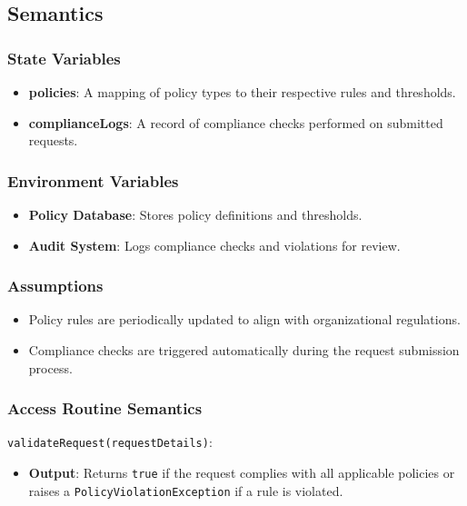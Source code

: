 \documentclass[12pt, titlepage]{article}
\begin{document}
\subsection{Semantics}

\subsubsection{State Variables}
\begin{itemize}
    \item \textbf{policies}: A mapping of policy types to their respective rules and thresholds.
    \item \textbf{complianceLogs}: A record of compliance checks performed on submitted requests.
\end{itemize}

\subsubsection{Environment Variables}
\begin{itemize}
    \item \textbf{Policy Database}: Stores policy definitions and thresholds.
    \item \textbf{Audit System}: Logs compliance checks and violations for review.
\end{itemize}

\subsubsection{Assumptions}
\begin{itemize}
    \item Policy rules are periodically updated to align with organizational regulations.
    \item Compliance checks are triggered automatically during the request submission process.
\end{itemize}

\subsubsection{Access Routine Semantics}

\noindent \texttt{validateRequest(requestDetails)}:
\begin{itemize}
    \item \textbf{Output}: Returns \texttt{true} if the request complies with all applicable policies or raises a \texttt{PolicyViolationException} if a rule is violated.
\end{itemize}
\end{document}
